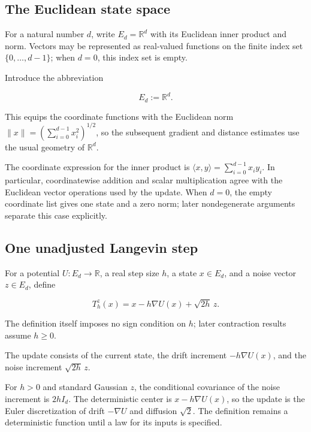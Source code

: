 \documentclass[11pt,a4paper]{report}
\begin{document}
\subsection{\texorpdfstring{The Euclidean state space}{The Euclidean state space}}
\label{report-step-UnadjustedLangevin-ULAStep-lean-1}


For a natural number \(d\), write \(E_d=\mathbb R^d\) with its Euclidean inner product and norm. Vectors may be represented as real-valued functions on the finite index set \(\{0,\ldots,d-1\}\); when \(d=0\), this index set is empty.



Introduce the abbreviation

\[E_d:=\mathbb R^d.\]

This equips the coordinate functions with the Euclidean norm \(\|x\|=(\sum_{i=0}^{d-1}x_i^2)^{1/2}\), so the subsequent gradient and distance estimates use the usual geometry of \(\mathbb R^d\).



The coordinate expression for the inner product is \(\langle x,y\rangle=\sum_{i=0}^{d-1}x_iy_i\). In particular, coordinatewise addition and scalar multiplication agree with the Euclidean vector operations used by the update. When \(d=0\), the empty coordinate list gives one state and a zero norm; later nondegenerate arguments separate this case explicitly.

\subsection{\texorpdfstring{One unadjusted Langevin step}{One unadjusted Langevin step}}
\label{report-step-UnadjustedLangevin-ULAStep-lean-2}


For a potential \(U:E_d\to\mathbb R\), a real step size \(h\), a state \(x\in E_d\), and a noise vector \(z\in E_d\), define

\[T_h^z(x)=x-h\nabla U(x)+\sqrt{2h}\,z.\]

The definition itself imposes no sign condition on \(h\); later contraction results assume \(h\ge0\).



The update consists of the current state, the drift increment \(-h\nabla U(x)\), and the noise increment \(\sqrt{2h}\,z\).



For \(h>0\) and standard Gaussian \(z\), the conditional covariance of the noise increment is \(2hI_d\). The deterministic center is \(x-h\nabla U(x)\), so the update is the Euler discretization of drift \(-\nabla U\) and diffusion \(\sqrt2\). The definition remains a deterministic function until a law for its inputs is specified.
\end{document}
